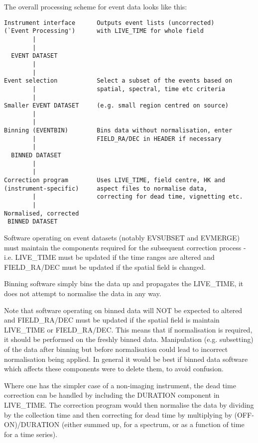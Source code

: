 The overall processing scheme for event data looks like this:

\begin{verbatim}
Instrument interface      Outputs event lists (uncorrected)
(`Event Processing')      with LIVE_TIME for whole field
        |
        |
  EVENT DATASET
        |
        |
Event selection           Select a subset of the events based on 
        |                 spatial, spectral, time etc criteria
        |
Smaller EVENT DATASET     (e.g. small region centred on source)
        |
        |
Binning (EVENTBIN)        Bins data without normalisation, enter
        |                 FIELD_RA/DEC in HEADER if necessary
        |
  BINNED DATASET
        |
        |
Correction program        Uses LIVE_TIME, field centre, HK and 
(instrument-specific)     aspect files to normalise data, 
        |                 correcting for dead time, vignetting etc.
        |
Normalised, corrected
 BINNED DATASET
\end{verbatim}

Software operating on event datasets (notably  EVSUBSET  and  EVMERGE)
must  maintain  the  components required for the subsequent correction
process - i.e.  LIVE\_TIME must be  updated  if  the  time  ranges  are
altered  and  FIELD\_RA/DEC  must  be  updated  if the spatial field is
changed.

Binning software simply bins the data up and propagates the LIVE\_TIME,
it does not attempt to normalise the data in any way.

Note that software operating on binned data will NOT  be  expected  to
altered  and  FIELD\_RA/DEC  must  be  updated  if the spatial field is
maintain  LIVE\_TIME or FIELD\_RA/DEC.  This means that if normalisation
is required, it should  be  performed  on  the  freshly  binned  data.
Manipulation  (e.g.   subsetting) of the data after binning but before
normalisation could lead to incorrect normalisation being applied.  In
general  it  would be best if binned data software which affects these
components were to delete them, to avoid confusion.

Where one has the simpler case of a non-imaging instrument,  the  dead
time  correction can be handled by including the DURATION component in
LIVE\_TIME.  The correction program would then normalise  the  data  by
dividing  by  the collection time and then correcting for dead time by
multiplying by (OFF-ON)/DURATION (either summed up, for a spectrum, or
as a function of time for a time series).

